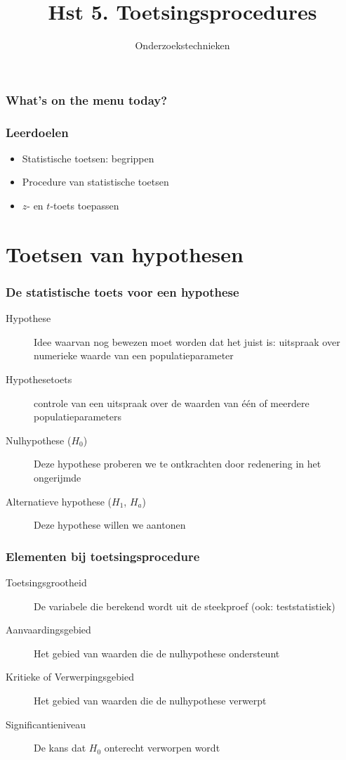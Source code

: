 \documentclass[aspectratio=169]{beamer}
\title{Hst 5. Toetsingsprocedures}
\subtitle{Onderzoekstechnieken}
\begin{document}
\begin{frame}
  \maketitle
\end{frame}

\begin{frame}
  \frametitle{What's on the menu today?}
  
  \tableofcontents
\end{frame}

\begin{frame}
  \frametitle{Leerdoelen}
  
  \begin{itemize}
    \item Statistische toetsen: begrippen
    \item Procedure van statistische toetsen
    \item $z$- en $t$-toets toepassen
  \end{itemize}
\end{frame}


\section{Toetsen van hypothesen}

\begin{frame}
  \frametitle{De statistische toets voor een hypothese}
  
  \begin{description}
    \item[Hypothese] Idee waarvan nog bewezen moet worden dat het juist is: uitspraak over numerieke waarde van een populatieparameter
    \item[Hypothesetoets] controle van een uitspraak over de waarden van één of meerdere populatieparameters
    \item[Nulhypothese ($H_0$)] Deze hypothese proberen we te ontkrachten door redenering in het ongerijmde
    \item[Alternatieve hypothese ($H_1$, $H_a$)] Deze hypothese willen we aantonen
  \end{description}
\end{frame}

\begin{frame}
  \frametitle{Elementen bij toetsingsprocedure}
  
  \begin{description}
    \item[Toetsingsgrootheid] De variabele die berekend wordt uit de steekproef (ook: teststatistiek)
    \item[Aanvaardingsgebied] Het gebied van waarden die de nulhypothese \alert{ondersteunt}
    \item[Kritieke of Verwerpingsgebied] Het gebied van waarden die de nulhypothese \alert{verwerpt}
    \item[Significantieniveau] De kans dat $H_0$ \alert{onterecht} verworpen wordt
  \end{description}
\end{frame}
\end{document}
